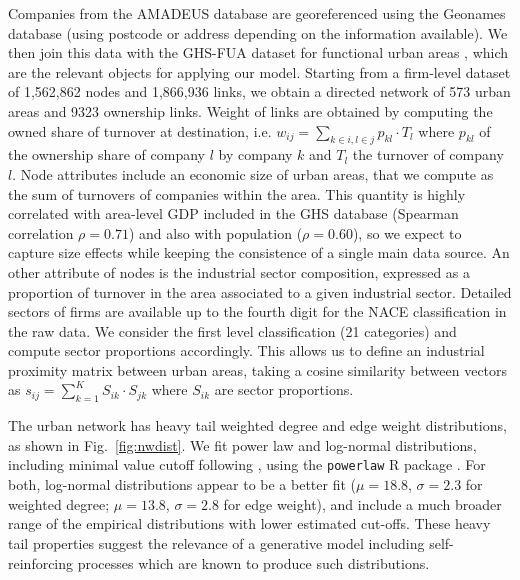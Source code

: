 \documentclass[11pt]{article}
\begin{document}

Companies from the AMADEUS database are georeferenced using the Geonames database (using postcode or address depending on the information available). We then join this data with the GHS-FUA dataset for functional urban areas \cite{Florczyk2019ghs}, which are the relevant objects for applying our model. Starting from a firm-level dataset of 1,562,862 nodes and  1,866,936 links, we obtain a directed network of 573 urban areas and 9323 ownership links. Weight of links are obtained by computing the owned share of turnover at destination, i.e. $w_{ij} = \sum_{k \in i,l \in j} p_{kl} \cdot T_l$ where $p_{kl}$ of the ownership share of company $l$ by company $k$ and $T_l$ the turnover of company $l$. Node attributes include an economic size of urban areas, that we compute as the sum of turnovers of companies within the area. This quantity is highly correlated with area-level GDP included in the GHS database (Spearman correlation $\rho = 0.71$) and also with population ($\rho = 0.60$), so we expect to capture size effects while keeping the consistence of a single main data source. An other attribute of nodes is the industrial sector composition, expressed as a proportion of turnover in the area associated to a given industrial sector. Detailed sectors of firms are available up to the fourth digit for the NACE classification in the raw data. We consider the first level classification (21 categories) and compute sector proportions accordingly. This allows us to define an industrial proximity matrix between urban areas, taking a cosine similarity between vectors as $s_{ij} = \sum_{k=1}^{K} S_{ik}\cdot S_{jk}$ where $S_{ik}$ are sector proportions.


The urban network has heavy tail weighted degree and edge weight distributions, as shown in Fig.~\ref{fig:nwdist}. We fit power law and log-normal distributions, including minimal value cutoff following \cite{clauset2009power}, using the \texttt{powerlaw} R package \cite{powerlawpackage}. For both, log-normal distributions appear to be a better fit ($\mu=18.8$, $\sigma=2.3$ for weighted degree; $\mu=13.8$, $\sigma=2.8$ for edge weight), and include a much broader range of the empirical distributions with lower estimated cut-offs. These heavy tail properties suggest the relevance of a generative model including self-reinforcing processes which are known to produce such distributions.
\end{document}
